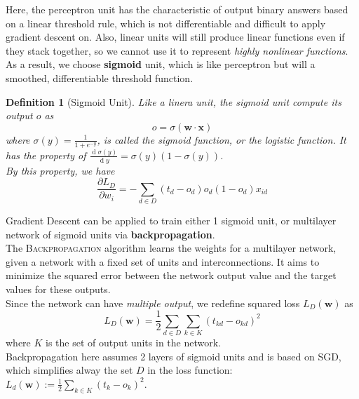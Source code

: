 \documentclass[12pt]{article}
\newtheorem{definition}{Definition}[section]
\theoremstyle{definition}
\DeclareMathOperator{\diff}{d}
\begin{document}
Here, the perceptron unit has the characteristic of output binary answers based on a linear threshold rule, which is not differentiable and difficult to apply gradient descent on. Also, linear units will still produce linear functions even if they stack together, so we cannot use it to represent \textit{highly nonlinear functions}. As a result, we choose \textbf{sigmoid} unit, which is like perceptron but will a smoothed, differentiable threshold function.
\begin{definition}[Sigmoid Unit]
\normalfont Like a linera unit, the sigmoid unit compute its output $o$ as 
\[
o=\sigma(\mathbf{w}\cdot\mathbf{x})
\]
where $\sigma(y)=\frac{1}{1+e^{-y}}$, is called the sigmoid function, or the logistic function. It has the property of $\frac{\diff \sigma(y)}{\diff y}=\sigma(y)(1-\sigma(y))$.\\
By this property, we have 
\[
\frac{\partial L_D}{\partial w_i}=-\sum_{d\in D}(t_d-o_d)o_d(1-o_d)x_{id}
\]
\end{definition}
Gradient Descent can be applied to train either 1 sigmoid unit, or multilayer network of sigmoid units via \textbf{backpropagation}.\\
The \textsc{Backpropagation} algorithm learns the weights for a multilayer network, given a network with a fixed set of units and interconnections. It aims to minimize the squared error between the network output value and the target values for these outputs.\\
Since the network can have \textit{multiple output}, we redefine squared loss $L_D(\mathbf{w})$ as
\[
L_D(\mathbf{w})=\frac{1}{2}\sum_{d\in D}\sum_{k\in K}(t_{kd}-o_{kd})^2
\]
where $K$ is the set of output units in the network.\\
Backpropagation here assumes 2 layers of sigmoid units and is based on SGD, which simplifies alway the set $D$ in the loss function: $L_d(\mathbf{w}):=\frac{1}{2}\sum_{k\in K}(t_k-o_k)^2$.
\end{document}
